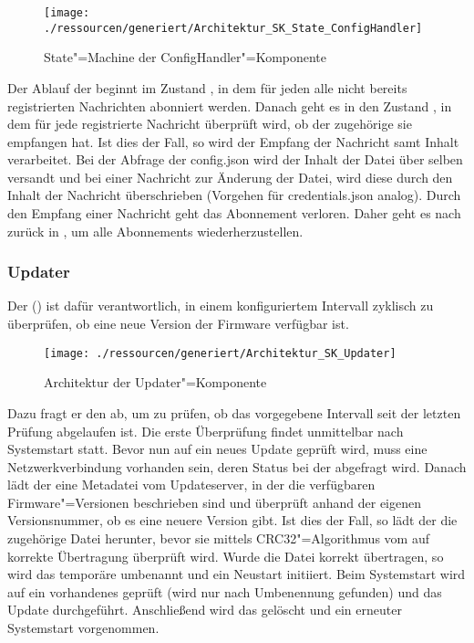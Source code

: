 \begin{figure}[!htb]
    \centering
    \texttt{[image: ./ressourcen/generiert/Architektur\_SK\_State\_ConfigHandler]}
    \caption{State"=Machine der ConfigHandler"=Komponente}
    \label{fig:Architektur_SK_State_ConfigHandler}
\end{figure}

Der Ablauf der  beginnt im Zustand , in dem für jeden  alle nicht bereits registrierten Nachrichten abonniert werden.
Danach geht es in den Zustand , in dem für jede registrierte Nachricht überprüft wird, ob der zugehörige  sie empfangen hat.
Ist dies der Fall, so wird der Empfang der Nachricht samt Inhalt verarbeitet.
Bei der Abfrage der config.json wird der Inhalt der Datei über selben  versandt und bei einer Nachricht zur Änderung der Datei, wird diese durch den Inhalt der Nachricht überschrieben (Vorgehen für credentials.json analog).
Durch den Empfang einer Nachricht geht das Abonnement verloren.
Daher geht es nach  zurück in , um alle Abonnements wiederherzustellen.

\subsubsection{Updater}
Der  () ist dafür verantwortlich, in einem konfiguriertem Intervall zyklisch zu überprüfen, ob eine neue Version der Firmware verfügbar ist.

\begin{figure}[!htb]
    \centering
    \texttt{[image: ./ressourcen/generiert/Architektur\_SK\_Updater]}
    \caption{Architektur der Updater"=Komponente}
    \label{fig:Architektur_SK_Updater}
\end{figure}

Dazu fragt er den  ab, um zu prüfen, ob das vorgegebene Intervall seit der letzten Prüfung abgelaufen ist.
Die erste Überprüfung findet unmittelbar nach Systemstart statt.
Bevor nun auf ein neues Update geprüft wird, muss eine Netzwerkverbindung vorhanden sein, deren Status bei der  abgefragt wird.
Danach lädt der  eine Metadatei vom Updateserver, in der die verfügbaren Firmware"=Versionen beschrieben sind und überprüft anhand der eigenen Versionsnummer, ob es eine neuere Version gibt.
Ist dies der Fall, so lädt der  die zugehörige Datei herunter, bevor sie mittels CRC32"=Algorithmus vom  auf korrekte Übertragung überprüft wird.
Wurde die Datei korrekt übertragen, so wird das temporäre  umbenannt und ein Neustart initiiert.
Beim Systemstart wird auf ein vorhandenes  geprüft (wird nur nach Umbenennung gefunden) und das Update durchgeführt.
Anschließend wird das  gelöscht und ein erneuter Systemstart vorgenommen.


